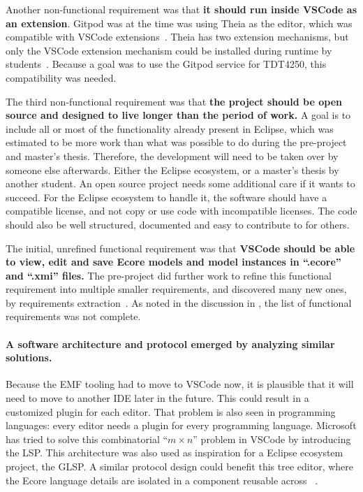 Another non-functional requirement was that \textbf{it should run inside \gls{VSCode} as an extension}.
Gitpod was at the time was using \gls{Theia} as the editor, which was compatible with \gls{VSCode} extensions~\cite{rekstadModelingEnvironmentCloud2020}.
\Gls{Theia} has two extension mechanisms, but only the \gls{VSCode} extension mechanism could be installed during runtime by students~\cite{rekstadModelingEnvironmentCloud2020}.
Because a goal was to use the Gitpod service for \gls{TDT4250}, this compatibility was needed.


The third non-functional requirement was that \textbf{the project should be \gls{open source} and designed to live longer than the period of work.}
A goal is to include all or most of the functionality already present in \gls{Eclipse}, which was estimated to be more work than what was possible to do during the pre-project and master's thesis.
Therefore, the development will need to be taken over by someone else afterwards.
Either the Eclipse ecosystem, or a master's thesis by another student.
An \gls{open source} project needs some additional care if it wants to succeed.
For the Eclipse ecosystem to handle it, the software should have a compatible license, and not copy or use code with incompatible licenses.
The code should also be well structured, documented and easy to contribute to for others.


The initial, unrefined functional requirement was that \textbf{\gls{VSCode} should be able to view, edit and save \gls{Ecore} models and model instances in ``.ecore'' and ``.xmi'' files.}
The pre-project did further work to refine this functional requirement into multiple smaller requirements, and discovered many new ones, by requirements extraction~\cite[p.~47,48]{rekstadModelingEnvironmentCloud2020}.
As noted in the discussion in \cite[p.~51]{rekstadModelingEnvironmentCloud2020}, the list of functional requirements was not complete.


\paragraph{A software architecture and protocol emerged by analyzing similar solutions.}
Because the \acrshort{EMF} tooling had to move to \gls{VSCode} now, it is plausible that it will need to move to another \acrshort{IDE} later in the future.
This could result in a customized plugin for each editor.
That problem is also seen in programming languages: every editor needs a plugin for every programming language.
Microsoft has tried to solve this combinatorial ``\(m{\times}n\)'' problem in \gls{VSCode} by introducing the \acrfull{LSP}.
This architecture was also used as inspiration for a Eclipse ecosystem project, the \acrfull{GLSP}.
A similar protocol design could benefit this tree editor, where the \gls{Ecore} language details are isolated in a component reusable across ~\cite{rekstadModelingEnvironmentCloud2020}.


